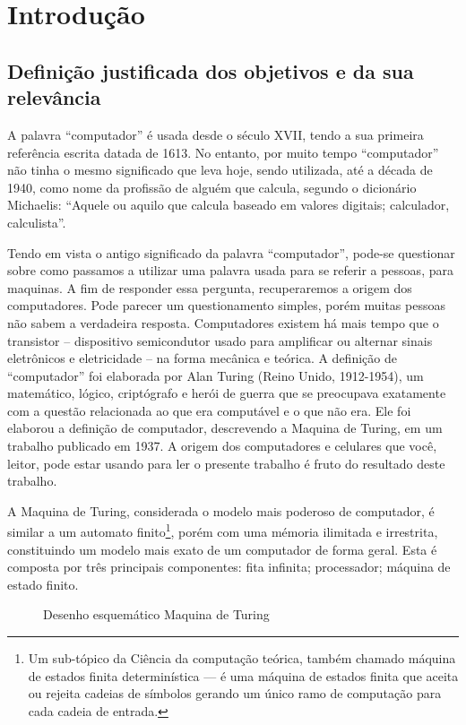 \section{Introdução} 
\subsection{Definição justificada dos objetivos e da sua relevância}
A palavra “computador” é usada desde o século XVII, tendo a sua primeira referência escrita datada de 1613. No entanto, por muito tempo “computador” não tinha o mesmo significado que leva hoje, sendo utilizada, até a década de 1940, como nome da profissão de alguém que calcula, segundo o dicionário Michaelis: “Aquele ou aquilo que calcula baseado em valores digitais; calculador, calculista”. \cite{4}

Tendo em vista o antigo significado da palavra “computador”, pode-se questionar sobre como passamos a utilizar uma palavra usada para se referir a pessoas, para maquinas. A fim de responder essa pergunta, recuperaremos a origem dos computadores. Pode parecer um questionamento simples, porém muitas pessoas não sabem a verdadeira resposta. Computadores existem há mais tempo que o transistor – dispositivo semicondutor usado para amplificar ou alternar sinais eletrônicos e eletricidade – na forma mecânica e teórica. A definição de ``computador'' foi elaborada por Alan Turing (Reino Unido, 1912-1954), um matemático, lógico, criptógrafo e herói de guerra que se preocupava exatamente com a questão relacionada ao que era computável e o que não era. Ele foi elaborou a definição de computador, descrevendo a Maquina de Turing, em um trabalho publicado em 1937. A origem dos computadores e celulares que você, leitor, pode estar usando para ler o presente trabalho é fruto do resultado deste trabalho.

A Maquina de Turing, considerada o modelo mais poderoso de computador, é similar a um automato finito\footnote{Um sub-tópico da Ciência da computação teórica, também chamado máquina de estados finita determinística — é uma máquina de estados finita que aceita ou rejeita cadeias de símbolos gerando um único ramo de computação para cada cadeia de entrada.}, porém com uma mémoria ilimitada e irrestrita, constituindo um modelo mais exato de um computador de forma geral. Esta é composta por três principais componentes: fita infinita; processador; máquina de estado finito. 


\vspace{1cm}
\begin{figure}[H] \centering 
  \caption{\label{fig:1} Desenho esquemático Maquina de Turing} 
\end{figure}

